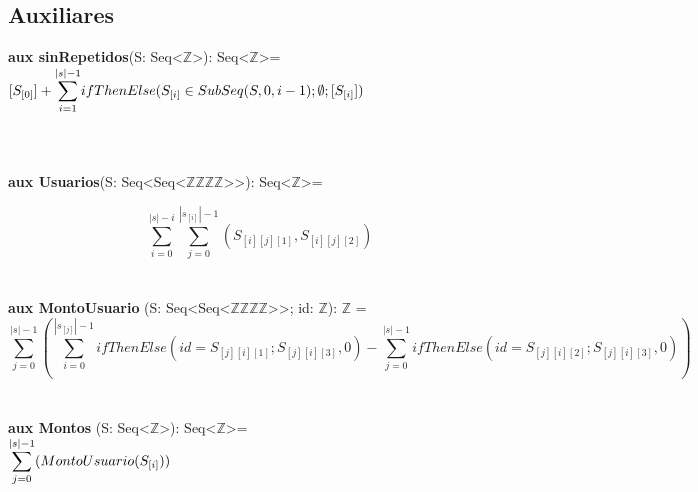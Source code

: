 \documentclass{article}
\begin{document}
\newpage %

\subsection{Auxiliares}

\textbf{aux sinRepetidos}(S: Seq\textless$\mathds{Z}$\textgreater): Seq\textless$\mathds{Z}$\textgreater = \\

    $[S_{[0]}] + \mathlarger\sum\limits_{i=1}^{|s|-1} ifThenElse(S_{[i]} \in SubSeq(S, 0, i-1); \emptyset; [S_{[i]}])$ \\\\\\\\
\textbf{aux Usuarios}(S: Seq\textless Seq\textless$\mathds{Z}$\texttimes$\mathds{Z}$\texttimes$\mathds{Z}$\texttimes$\mathds{Z}$\textgreater\textgreater): Seq\textless$\mathds{Z}$\textgreater=

    \[
    \sum\limits_{i=0}^{|s|-i} \sum\limits_{j=0}^{|s_{[i]}|-1} \left(S_{[i][j][1]}, S_{[i][j][2]}\right)
    \]\\\\
\textbf{aux MontoUsuario} (S: Seq\textless Seq\textless $\mathds{Z}$\texttimes$\mathds{Z}$\texttimes$\mathds{Z}$\texttimes$\mathds{Z}$\textgreater\textgreater; id: $\mathds{Z}$): $\mathds{Z}$ =
    \[
    \sum\limits_{j=0}^{|s|-1} \left( \sum\limits_{i=0}^{|s_{[j]}|-1} 
    ifThenElse(id = S_{[j][i][1]}; S_{[j][i][3]}, 0) 
    - \sum\limits_{j=0}^{|s|-1} ifThenElse(id = S_{[j][i][2]}; S_{[j][i][3]}, 0) \right)
    \]\\\\
\textbf{aux Montos} (S: Seq\textless$\mathds{Z}$\textgreater): Seq\textless$\mathds{Z}$\textgreater = \\

    $\mathlarger\sum\limits_{j=0}^{|s|-1} (MontoUsuario(S_{[i]}))$
\end{document}
